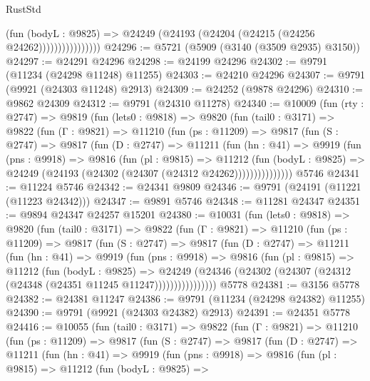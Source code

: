 \begin{lexlean}{RustStd}
\begin{coremodule}
                          (fun (bodyL : @9825) =>
                          @24249 (@24193 (@24204 (@24215 (@24256 @24262))))))))))))))))
@24296 := @5721 (@5909 (@3140 (@3509 @2935) @3150))
@24297 := @24291 @24296
@24298 := @24199 @24296
@24302 := @9791 (@11234 (@24298 @11248) @11255)
@24303 := @24210 @24296
@24307 := @9791 (@9921 (@24303 @11248) @2913)
@24309 := @24252 (@9878 @24296)
@24310 := @9862 @24309
@24312 := @9791 (@24310 @11278)
@24340 := @10009
    (fun (rty : @2747) =>
    @9819
      (fun (lets0 : @9818) =>
      @9820
        (fun (tail0 : @3171) =>
        @9822
          (fun (Γ : @9821) =>
          @11210
            (fun (ps : @11209) =>
            @9817
              (fun (S : @2747) =>
              @9817
                (fun (D : @2747) =>
                @11211
                  (fun (hn : @41) =>
                  @9919
                    (fun (pns : @9918) =>
                    @9816
                      (fun (pl : @9815) =>
                      @11212
                        (fun (bodyL : @9825) =>
                        @24249 (@24193 (@24302 (@24307 (@24312 @24262)))))))))))))))
    @5746
@24341 := @11224 @5746
@24342 := @24341 @9809
@24346 := @9791 (@24191 (@11221 (@11223 @24342)))
@24347 := @9891 @5746
@24348 := @11281 @24347
@24351 := @9894 @24347 @24257 @15201
@24380 := @10031
    (fun (lets0 : @9818) =>
    @9820
      (fun (tail0 : @3171) =>
      @9822
        (fun (Γ : @9821) =>
        @11210
          (fun (ps : @11209) =>
          @9817
            (fun (S : @2747) =>
            @9817
              (fun (D : @2747) =>
              @11211
                (fun (hn : @41) =>
                @9919
                  (fun (pns : @9918) =>
                  @9816
                    (fun (pl : @9815) =>
                    @11212
                      (fun (bodyL : @9825) =>
                      @24249
                        (@24346
                          (@24302 (@24307 (@24312 (@24348 (@24351 @11245 @11247))))))))))))))))
    @5778
@24381 := @3156 @5778
@24382 := @24381 @11247
@24386 := @9791 (@11234 (@24298 @24382) @11255)
@24390 := @9791 (@9921 (@24303 @24382) @2913)
@24391 := @24351 @5778
@24416 := @10055
    (fun (tail0 : @3171) =>
    @9822
      (fun (Γ : @9821) =>
      @11210
        (fun (ps : @11209) =>
        @9817
          (fun (S : @2747) =>
          @9817
            (fun (D : @2747) =>
            @11211
              (fun (hn : @41) =>
              @9919
                (fun (pns : @9918) =>
                @9816
                  (fun (pl : @9815) =>
                  @11212
                    (fun (bodyL : @9825) =>

\end{coremodule}
\end{lexlean}
